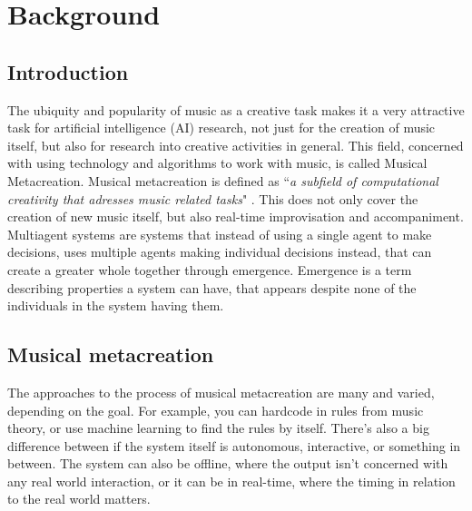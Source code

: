 \documentclass[a4paper,english]{report}
\begin{document}
	\chapter{Background}
	\section{Introduction}
	The ubiquity and popularity of music as a creative task makes it a very attractive task for artificial intelligence (AI) research, not just for the creation of music itself, but also for research into creative activities in general. This field, concerned with using technology and algorithms to work with music, is called Musical Metacreation. Musical metacreation is defined as ``\textit{a subfield of computational creativity that adresses music related tasks}" \cite{pasquier2017introduction}. This does not only cover the creation of new music itself, but also real-time improvisation and accompaniment.\\
	Multiagent systems are systems that instead of using a single agent to make decisions, uses multiple agents making individual decisions instead, that can create a greater whole  together through emergence. Emergence is a term describing properties a system can have, that appears despite none of the individuals in the system having them.
	
	\section{Musical metacreation}
	The approaches to the process of musical metacreation are many and varied, depending on the goal. For example, you can hardcode in rules from music theory, or use machine learning to find the rules by itself. There's also a big difference between if the system itself is autonomous, interactive, or something in between. The system can also be offline, where the output isn't concerned with any real world interaction, or it can be in real-time, where the timing in relation to the real world matters.
	
\end{document}
